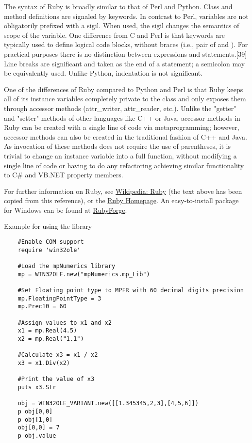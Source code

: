 	\vpara
	The syntax of Ruby is broadly similar to that of Perl and Python. Class and method definitions are signaled by keywords. In contrast to Perl, variables are not obligatorily prefixed with a sigil. When used, the sigil changes the semantics of scope of the variable. One difference from C and Perl is that keywords are typically used to define logical code blocks, without braces (i.e., pair of { and }). For practical purposes there is no distinction between expressions and statements.[39] Line breaks are significant and taken as the end of a statement; a semicolon may be equivalently used. Unlike Python, indentation is not significant.
	
	\vpara
	One of the differences of Ruby compared to Python and Perl is that Ruby keeps all of its instance variables completely private to the class and only exposes them through accessor methods (attr\_writer, attr\_reader, etc.). Unlike the "getter" and "setter" methods of other languages like C++ or Java, accessor methods in Ruby can be created with a single line of code via metaprogramming; however, accessor methods can also be created in the traditional fashion of C++ and Java. As invocation of these methods does not require the use of parentheses, it is trivial to change an instance variable into a full function, without modifying a single line of code or having to do any refactoring achieving similar functionality to C\# and VB.NET property members.
	
	\vpara
	For further information on Ruby, see \href{http://en.wikipedia.org/wiki/Ruby_(programming_language)}{Wikipedia: Ruby} (the text above has been copied from this reference), or the  \href{http://www.ruby-lang.org/en/}{Ruby Homepage}. An easy-to-install package for Windows can be found at  \href{http://rubyforge.org/projects/rubyinstaller}{RubyForge}.
	
	\vpara
	Example for using the library
	
	\begin{lstlisting}
	#Enable COM support
	require 'win32ole'
	
	#Load the mpNumerics library
	mp = WIN32OLE.new("mpNumerics.mp_Lib")
	
	#Set Floating point type to MPFR with 60 decimal digits precision
	mp.FloatingPointType = 3
	mp.Prec10 = 60
	
	#Assign values to x1 and x2
	x1 = mp.Real(4.5)
	x2 = mp.Real("1.1")
	
	#Calculate x3 = x1 / x2
	x3 = x1.Div(x2)
	
	#Print the value of x3
	puts x3.Str
	
	obj = WIN32OLE_VARIANT.new([[1.345345,2,3],[4,5,6]])
	p obj[0,0] 
	p obj[1,0] 
	obj[0,0] = 7
	p obj.value
	\end{lstlisting}
	
